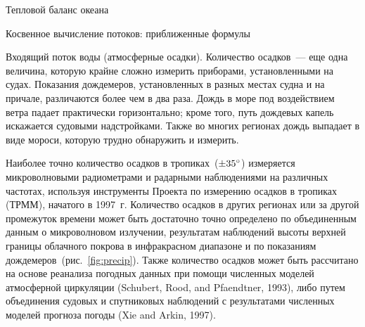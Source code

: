 \begin{chapter}{Тепловой баланс океана}
\begin{section}{Косвенное вычисление потоков: приближенные формулы}
\begin{paragraph}{Входящий поток воды (атмосферные осадки).}
Количество осадков~--- еще одна величина, которую крайне сложно измерить
приборами, установленными на судах. Показания дождемеров, установленных
в разных местах судна и на причале,
различаются более чем в два раза. Дождь в море под воздействием ветра 
падает практически горизонтально; кроме того, путь дождевых капель искажается
судовыми надстройками. Также во многих регионах дождь выпадает в виде
мороси, которую трудно обнаружить и измерить.
%

Наиболее точно количество осадков в тропиках~($\pm {35}^\circ$)
измеряется микроволновыми радиометрами и радарными наблюдениями на различных
частотах, используя инструменты Проекта по измерению осадков в тропиках (ТРММ),
начатого в 1997~г. Количество осадков в других регионах или за другой
промежуток времени может быть достаточно точно определено по объединенным
данным о микроволновом излучении, результатам наблюдений высоты верхней 
границы облачного покрова в инфракрасном диапазоне и по показаниям 
дождемеров~(рис.~\ref{fig:precip}). Также количество осадков может быть 
рассчитано на основе реанализа погодных данных при помощи численных моделей 
атмосферной циркуляции (Schubert, Rood, and Pfaendtner, 1993), 
либо путем объединения судовых и спутниковых наблюдений с результатами 
численных моделей прогноза погоды (Xie and Arkin, 1997).
%


\end{paragraph}
\end{section}
\end{chapter}
